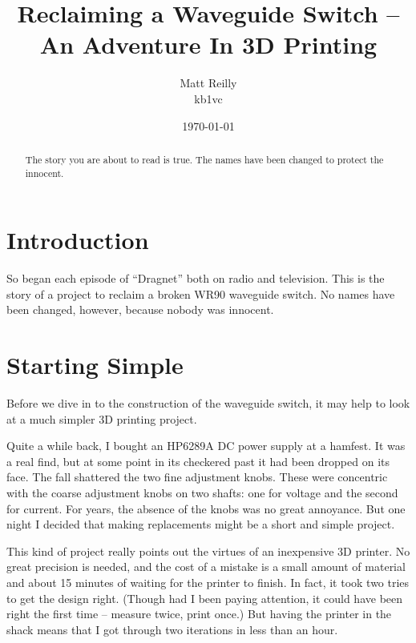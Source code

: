 \documentclass[12pt, twocolumn]{article}
\title{Reclaiming a Waveguide Switch -- An Adventure In 3D Printing}
\author{Matt Reilly  \\
	kb1vc \\
	}
\date{\today}
\begin{document}
\maketitle


\begin{abstract}
  The story you are about to read is true.  The names have been
  changed to protect the innocent.
\end{abstract}




\section{Introduction}
So began each episode of ``Dragnet'' both on radio and television.
This is the story of a project to reclaim a broken WR90 waveguide
switch.  No names have been changed, however, because nobody was innocent.

\section{Starting Simple}
Before we dive in to the construction of the waveguide switch,
it may help to look at a much simpler 3D printing project.

Quite a while back, I bought an HP6289A DC power supply at a hamfest.
It was a real find, but at some point in its checkered past it had
been dropped on its face.
The fall shattered the two fine adjustment knobs.  These were
concentric with the coarse adjustment knobs on two shafts: one for
voltage and the second for current.
For years, the absence of the knobs was no great annoyance. But one night
I decided that making replacements might be a short and simple project.

This kind of project really points out the virtues of an inexpensive
3D printer.  No great precision is needed, and the cost of a mistake
is a small amount of material and about 15 minutes of waiting for the
printer to finish.
In fact, it took two tries to get the design right. (Though had I
been paying attention, it could have been right the first time --
measure twice, print once.) But having the printer in the shack
means that I got through two iterations in less than an hour.
\end{document}
